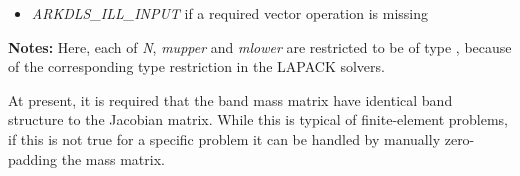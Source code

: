 \documentclass[letterpaper,10pt,english]{sphinxmanual}
\begin{document}
\begin{fulllineitems}
\begin{description}
\begin{itemize}
\item {} 
\emph{ARKDLS\_ILL\_INPUT} if a required vector operation is missing

\end{itemize}

\end{description}

\textbf{Notes:} Here, each of \emph{N}, \emph{mupper} and \emph{mlower} are restricted
to be of type , because of the corresponding type restriction
in the LAPACK solvers.

At present, it is required that the band mass matrix have identical
band structure to the Jacobian matrix.  While this is typical of
finite-element problems, if this is not true for a specific problem
it can be handled by manually zero-padding the mass matrix.

\end{fulllineitems}

\end{document}
